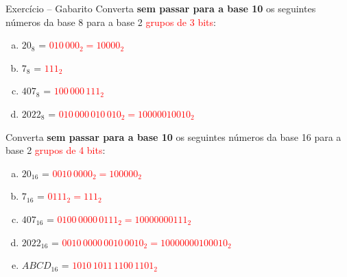 \begin{frame}{Exercício -- Gabarito}
    Converta \textbf{sem passar para a base 10} os seguintes números da base 8 para a base 2 \textcolor{red}{grupos de 3 bits}:

    \begin{enumerate}[a)]
        \item $20_8$ = \textcolor{red}{$010\,000_2 = 10000_2$}
        \item $7_8$ = \textcolor{red}{$111_2$}
        \item $407_8$ = \textcolor{red}{$100\,000\,111_2$}
        \item $2022_8$ = \textcolor{red}{$010\,000\,010\,010_2 = 10000010010_2$}
    \end{enumerate}

    \vspace{0.3cm} %

    Converta \textbf{sem passar para a base 10} os seguintes números da base 16 para a base 2 \textcolor{red}{grupos de 4 bits}:
    \begin{enumerate}[a)]
        \item $20_{16}$ = \textcolor{red}{$0010\,0000_2 = 100000_2$}
        \item $7_{16}$ = \textcolor{red}{$0111_2 = 111_2$}
        \item $407_{16}$ = \textcolor{red}{$0100\,0000\,0111_2 = 10000000111_2$}
        \item $2022_{16}$ = \textcolor{red}{$0010\,0000\,0010\,0010_2 = 10000000100010_2$}
        \item $ABCD_{16}$ = \textcolor{red}{$1010\,1011\,1100\,1101_2$}
    \end{enumerate}
\end{frame}

